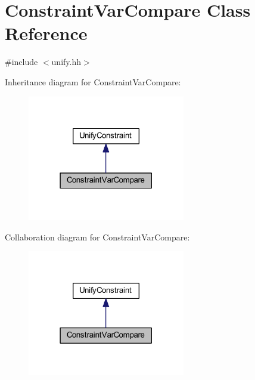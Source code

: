 \hypertarget{class_constraint_var_compare}{}\section{Constraint\+Var\+Compare Class Reference}
\label{class_constraint_var_compare}


{\ttfamily \#include $<$unify.\+hh$>$}



Inheritance diagram for Constraint\+Var\+Compare\+:
\nopagebreak
\begin{figure}[H]
\begin{center}
\leavevmode
\includegraphics[width=195pt]{class_constraint_var_compare__inherit__graph}
\end{center}
\end{figure}


Collaboration diagram for Constraint\+Var\+Compare\+:
\nopagebreak
\begin{figure}[H]
\begin{center}
\leavevmode
\includegraphics[width=195pt]{class_constraint_var_compare__coll__graph}
\end{center}
\end{figure}
